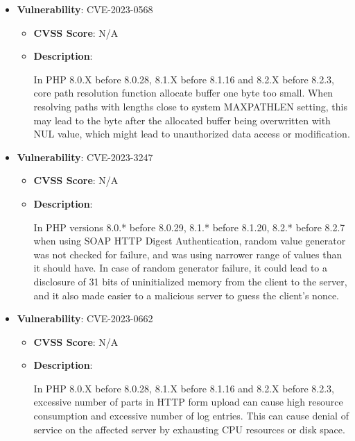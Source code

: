 \documentclass{article}
\begin{document}
\begin{itemize}
    
        \item \textbf{Vulnerability}: CVE-2023-0568
        \begin{itemize}
            \item \textbf{CVSS Score}:  N/A 
            \item \textbf{Description}:
            \parbox[t]{0.9\linewidth}{
                \ttfamily In PHP 8.0.X before 8.0.28, 8.1.X before 8.1.16 and 8.2.X before 8.2.3, core path resolution function allocate buffer one byte too small. When resolving paths with lengths close to system MAXPATHLEN setting, this may lead to the byte after the allocated buffer being overwritten with NUL value, which might lead to unauthorized data access or modification.
            }
        \end{itemize}
    
        \item \textbf{Vulnerability}: CVE-2023-3247
        \begin{itemize}
            \item \textbf{CVSS Score}:  N/A 
            \item \textbf{Description}:
            \parbox[t]{0.9\linewidth}{
                \ttfamily In PHP versions 8.0.* before 8.0.29, 8.1.* before 8.1.20, 8.2.* before 8.2.7 when using SOAP HTTP Digest Authentication, random value generator was not checked for failure, and was using narrower range of values than it should have. In case of random generator failure, it could lead to a disclosure of 31 bits of uninitialized memory from the client to the server, and it also made easier to a malicious server to guess the client's nonce.
            }
        \end{itemize}
    
        \item \textbf{Vulnerability}: CVE-2023-0662
        \begin{itemize}
            \item \textbf{CVSS Score}:  N/A 
            \item \textbf{Description}:
            \parbox[t]{0.9\linewidth}{
                \ttfamily In PHP 8.0.X before 8.0.28, 8.1.X before 8.1.16 and 8.2.X before 8.2.3, excessive number of parts in HTTP form upload can cause high resource consumption and excessive number of log entries. This can cause denial of service on the affected server by exhausting CPU resources or disk space.
            }
        \end{itemize}
    

\end{itemize}
\end{document}
